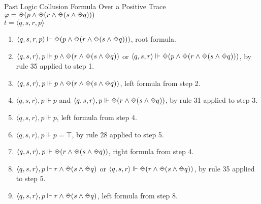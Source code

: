 \begin{myEx} Past Logic Collusion Formula Over a Positive Trace\\

\noindent
$\varphi = \LTLonce(p \land \LTLonce(r \land \LTLonce(s \land \LTLonce q)))$\\
$t = \langle q, s, r, p \rangle$\\

\begin{enumerate}
\item $\langle q,s,r,p \rangle \Vdash \LTLonce(p \land \LTLonce(r \land \LTLonce(s \land \LTLonce q)))$, root formula.\\ %

\item $\langle q,s,r \rangle, p \Vdash p \land \LTLonce(r \land \LTLonce(s \land \LTLonce q))$ or $\langle q,s,r \rangle \Vdash \LTLonce(p \land \LTLonce(r \land \LTLonce(s \land \LTLonce q)))$, by rule 35 applied to step 1.\\ %

\item $\langle q,s,r \rangle, p \Vdash p \land \LTLonce(r \land \LTLonce(s \land \LTLonce q))$, left formula from step 2.\\ %

\item $\langle q,s,r \rangle, p \Vdash p$ and $\langle q,s,r \rangle, p \Vdash \LTLonce(r \land \LTLonce(s \land \LTLonce q))$, by rule 31 applied to step 3.\\ %

\item $\langle q,s,r \rangle, p \Vdash p$, left formula from step 4.\\ %

\item $\langle q,s,r \rangle, p \Vdash p = \top$, by rule 28 applied to step 5.\\ %

\item $\langle q,s,r \rangle, p \Vdash \LTLonce(r \land \LTLonce(s \land \LTLonce q))$, right formula from step 4.\\ %

\item $\langle q,s,r \rangle, p \Vdash r \land \LTLonce(s \land \LTLonce q)$ or $\langle q,s,r \rangle \Vdash \LTLonce(r \land \LTLonce(s \land \LTLonce q))$, by rule 35 applied to step 5.\\ %

\item $\langle q,s,r \rangle, p \Vdash r \land \LTLonce(s \land \LTLonce q)$, left formula from step 8.\\ %


\end{enumerate}
\end{myEx}
